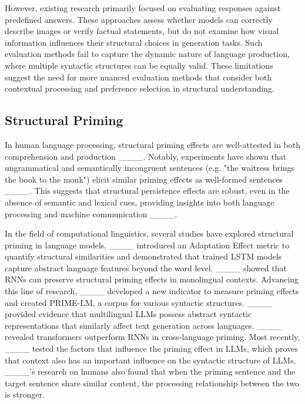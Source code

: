 However, existing research primarily focused on evaluating responses against predefined answers. These approaches assess whether models can correctly describe images or verify factual statements, but do not examine how visual information influences their structural choices in generation tasks. Such evaluation methods fail to capture the dynamic nature of language production, where multiple syntactic structures can be equally valid. These limitations suggest the need for more nuanced evaluation methods that consider both contextual processing and preference selection in structural understanding.

\subsection{Structural Priming}
 In human language processing, structural priming effects are well-attested in both comprehension and production ____. Notably, experiments have shown that ungrammatical and semantically incongruent sentences (e.g. "the waitress brings the book to the monk") elicit similar priming effects as well-formed sentences ____. This suggests that structural persistence effects are robust, even in the absence of semantic and lexical cues, providing insights into both language processing and machine communication ____.

In the field of computational linguistics, several studies have explored structural priming in language models. ____ introduced an Adaptation Effect metric to quantify structural similarities and demonstrated that trained LSTM models capture abstract language features beyond the word level. ____ showed that RNNs can preserve structural priming effects in monolingual contexts. Advancing this line of research, ____ developed a new indicator to measure priming effects and created PRIME-LM, a corpus for various syntactic structures. ____ provided evidence that multilingual LLMs possess abstract syntactic representations that similarly affect text generation across languages. ____ revealed transformers outperform RNNs in cross-language priming. Most recently, ____ tested the factors that influence the priming effect in LLMs, which proves that context also has an important influence on the syntactic structure of LLMs. ____'s research on humans also found that when the priming sentence and the target sentence share similar content, the processing relationship between the two is stronger.

%